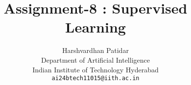 \documentclass{article}
\title{Assignment-8 : Supervised Learning}
\author{Harshvardhan Patidar\\
  Department of Artificial Intelligence\\
  Indian Institute of Technology Hyderabad\\
  \texttt{ai24btech11015@iith.ac.in}
}
\begin{document}
\



\maketitle






















\end{document}
